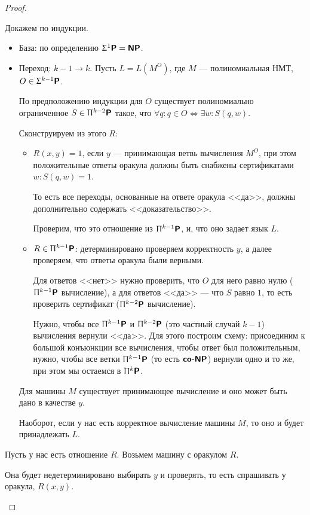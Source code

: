 \begin{proof}
   \begin{description}
       \item {} 
		   Докажем по индукции. 
		   \begin{itemize}
			   \item База: по определению $ \Upsigma^{1}\textmd{\textbf{\textsf{P}}} = \textmd{\textbf{\textsf{NP}}}$.
			   \item Переход: $ k-1 \to  k$. Пусть $ L = L(M^{O})$, где $ M$ --- полиномиальная НМТ, $ O \in \Upsigma^{k-1}\textmd{\textbf{\textsf{P}}}$.

				   По предположению индукции для $ O$ существует полиномиально ограниченное $ S \in \Uppi^{k-2}\textmd{\textbf{\textsf{P}}}$ такое, что $ \forall q\colon q \in O \Longleftrightarrow \exists w \colon S(q, w)$.

				   Сконструируем из этого $ R$:
				   \begin{itemize}
					   \item $ R(x, y) = 1$, если $ y$ --- принимающая ветвь вычисления $ M^{O}$, при этом положительные ответы оракула должны быть снабжены сертификатами  $ w\colon  S(q, w) = 1$.

						   То есть все переходы, основанные на ответе оракула <<да>>, должны дополнительно содержать <<доказательство>>.

						   Проверим, что это отношение из $ \Uppi^{k-1}\textmd{\textbf{\textsf{P}}}$, и, что оно задает язык $ L$.
					   \item $ R \in \Uppi^{k-1}\textmd{\textbf{\textsf{P}}}$: детерминировано проверяем корректность $ y$, а далее проверяем, что ответы оракула были верными. 
					   
					   Для ответов <<нет>> нужно проверить, что $ O$ для него равно нулю ($ \Uppi^{k-1}\textmd{\textbf{\textsf{P}}}$ вычисление), а для ответов <<да>>  --- что  $ S$ равно  $ 1$, то есть проверить сертификат ($ \Uppi^{k-2}\textmd{\textbf{\textsf{P}}}$ вычисление).

						   Нужно, чтобы все $ \Uppi^{k-1}\textmd{\textbf{\textsf{P}}}$ и $ \Uppi^{k-2}\textmd{\textbf{\textsf{P}}}$ (это частный случай $ k-1$) вычисления вернули <<да>>. Для этого построим схему: присоединим к большой конъюнкции все вычисления, чтобы ответ был положительным, нужно, чтобы все ветки $ \Uppi^{k-1}\textmd{\textbf{\textsf{P}}}$ (то есть $ \textmd{\textbf{\textsf{co-NP}}}$) вернули одно и то же, при этом мы остаемся в $ \Uppi^{k}\textmd{\textbf{\textsf{P}}}$.
				   \end{itemize}
				   Для машины $ M$ существует принимающее вычисление и оно может быть дано в качестве $ y$.

				   Наоборот, если у нас есть корректное вычисление машины $ M$, то оно и будет принадлежать $ L$.
		   \end{itemize}
       \item {}
		   Пусть у нас есть отношение $ R$.
		   Возьмем машину с оракулом $ R$.
		   
		   Она будет недетерминировано 
		   выбирать $ y$ и проверять, то есть спрашивать у оракула, $ R(x, y)$.
   \end{description}  
\end{proof}

